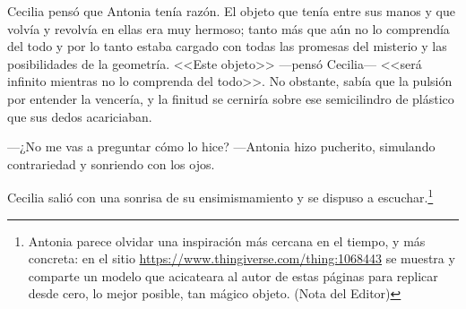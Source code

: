 Cecilia pensó que Antonia tenía razón. El objeto que tenía entre sus
manos y que volvía y revolvía en ellas era muy hermoso; tanto más que
aún no lo comprendía del todo y por lo tanto estaba cargado con todas
las promesas del misterio y las posibilidades de la geometría. <<Este
objeto>> ---pensó Cecilia--- <<será infinito mientras no lo comprenda
del todo>>. No obstante, sabía que la pulsión por entender la
vencería, y la finitud se cerniría sobre ese semicilindro de plástico
que sus dedos acariciaban.

---¿No me vas a preguntar cómo lo hice? ---Antonia hizo pucherito,
simulando contrariedad y sonriendo con los ojos.

Cecilia salió con una sonrisa de su ensimismamiento y se dispuso a
escuchar.\footnote{Antonia parece olvidar una inspiración más cercana
  en el tiempo, y más concreta: en el sitio
  \url{https://www.thingiverse.com/thing:1068443} se muestra y
  comparte un modelo que acicateara al autor de estas páginas para
  replicar desde cero, lo mejor posible, tan mágico objeto. (Nota del
  Editor)}


